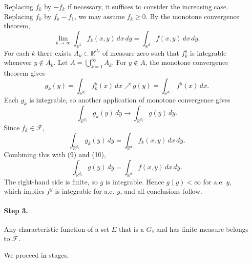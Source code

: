 \documentclass[11pt,openany]{book}
\begin{document}
Replacing $f_k$ by $-f_k$ if necessary, it suffices to consider the increasing case. Replacing $f_k$ by $f_k-f_1$, we may assume $f_k\geq0$. By the monotone convergence theorem,
\begin{equation}
\lim_{k\to\infty}\int_{\mathbb{R}^d}f_k(x,y)\,dx\,dy
=\int_{\mathbb{R}^d}f(x,y)\,dx\,dy.
\tag{9}
\end{equation}
For each $k$ there exists $A_k\subset\mathbb{R}^{d_2}$ of measure zero such that $f_k^y$ is integrable whenever $y\notin A_k$. Let $A=\bigcup_{k=1}^{\infty}A_k$. For $y\notin A$, the monotone convergence theorem gives
\[
g_k(y)=\int_{\mathbb{R}^{d_1}}f_k^y(x)\,dx
\nearrow
g(y)=\int_{\mathbb{R}^{d_1}}f^y(x)\,dx.
\]
Each $g_k$ is integrable, so another application of monotone convergence gives
\begin{equation}
\int_{\mathbb{R}^{d_2}}g_k(y)\,dy
\longrightarrow
\int_{\mathbb{R}^{d_2}}g(y)\,dy.
\tag{10}
\end{equation}
Since $f_k\in\mathcal{F}$,
\[
\int_{\mathbb{R}^{d_2}}g_k(y)\,dy
=\int_{\mathbb{R}^d}f_k(x,y)\,dx\,dy.
\]
Combining this with (9) and (10),
\[
\int_{\mathbb{R}^{d_2}}g(y)\,dy
=\int_{\mathbb{R}^d}f(x,y)\,dx\,dy.
\]
The right-hand side is finite, so $g$ is integrable. Hence $g(y)<\infty$ for a.e. $y$, which implies $f^y$ is integrable for a.e. $y$, and all conclusions follow.

\paragraph{Step 3.} Any characteristic function of a set $E$ that is a $G_\delta$ and has finite measure belongs to $\mathcal{F}$.

We proceed in stages.
\end{document}
